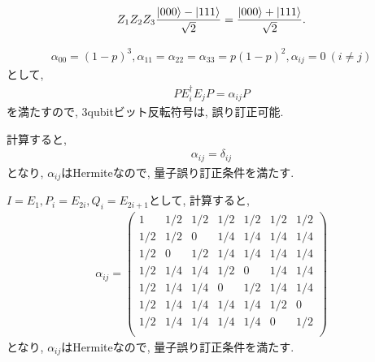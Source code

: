 \begin{ex}
    \label{ex10.6}
    \begin{align*}
        Z_1 Z_2 Z_3 \frac{\ket{000}-\ket{111}}{\sqrt{2}} = \frac{\ket{000} + \ket{111}}{\sqrt{2}}.
    \end{align*}
\end{ex}

\begin{ex}
    \label{ex10.7}
    \begin{align*}
        \alpha_{00} = (1-p)^3, \alpha_{11} = \alpha_{22} = \alpha_{33} = p(1-p)^2, \alpha_{ij} = 0 \ (i \neq j)
    \end{align*}
    として,
    \begin{align*}
        P E_i^\dagger E_j P = \alpha_{ij} P
    \end{align*}
    を満たすので, 3qubitビット反転符号は, 誤り訂正可能.
\end{ex}

\begin{ex}
    \label{ex10.8}
    計算すると,
    \begin{align*}
        \alpha_{ij} = \delta_{ij}
    \end{align*}
    となり, $\alpha_{ij}$はHermiteなので, 量子誤り訂正条件を満たす.
\end{ex}

\begin{ex}
    \label{ex10.9}
    $I = E_1, P_i = E_{2i}, Q_i = E_{2i+1}$として, 計算すると,
    \begin{align*}
        \alpha_{ij} =
        \begin{pmatrix}
            1   & 1/2 & 1/2 & 1/2 & 1/2 & 1/2 & 1/2 \\
            1/2 & 1/2 & 0   & 1/4 & 1/4 & 1/4 & 1/4 \\
            1/2 & 0   & 1/2 & 1/4 & 1/4 & 1/4 & 1/4 \\
            1/2 & 1/4 & 1/4 & 1/2 & 0   & 1/4 & 1/4 \\
            1/2 & 1/4 & 1/4 & 0   & 1/2 & 1/4 & 1/4 \\
            1/2 & 1/4 & 1/4 & 1/4 & 1/4 & 1/2 & 0   \\
            1/2 & 1/4 & 1/4 & 1/4 & 1/4 & 0   & 1/2 \\
        \end{pmatrix}
    \end{align*}
    となり, $\alpha_{ij}$はHermiteなので, 量子誤り訂正条件を満たす.
\end{ex}

